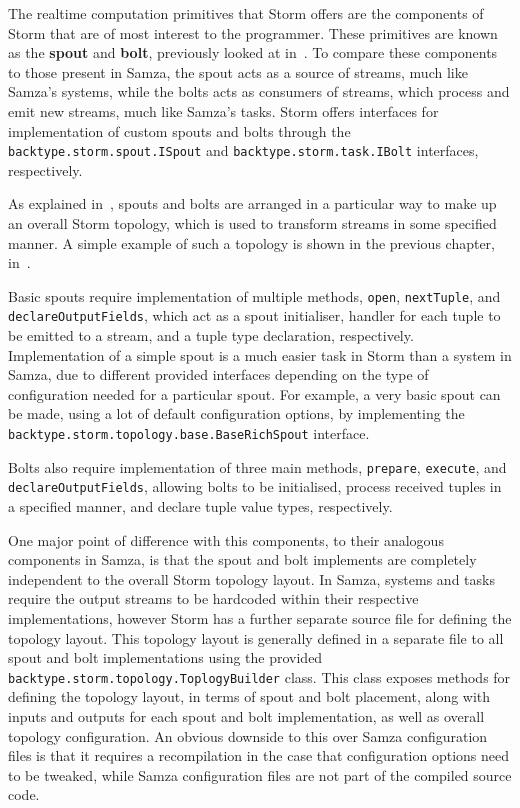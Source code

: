 The realtime computation primitives that Storm offers are the components of Storm that are of most interest to the programmer.
These primitives are known as the \textbf{spout} and \textbf{bolt}, previously looked at in~. To compare
these components to those present in Samza, the spout acts as a source of streams, much like Samza's systems, while the
bolts acts as consumers of streams, which process and emit new streams, much like Samza's tasks. Storm offers interfaces
for implementation of custom spouts and bolts through the \texttt{backtype.storm.spout.ISpout} and \texttt{backtype.storm.task.IBolt}
interfaces, respectively.

As explained in~, spouts and bolts are arranged in a particular way to make up an overall Storm topology,
which is used to transform streams in some specified manner. A simple example of such a topology is shown in the previous
chapter, in~.

Basic spouts require implementation of multiple methods, \texttt{open}, \texttt{nextTuple}, and \texttt{declareOutputFields},
which act as a spout initialiser, handler for each tuple to be emitted to a stream, and a tuple type declaration, respectively.
Implementation of a simple spout is a much easier task in Storm than a system in Samza, due to different provided interfaces
depending on the type of configuration needed for a particular spout. For example, a very basic spout can be made, using
a lot of default configuration options, by implementing the \texttt{backtype.storm.topology.base.BaseRichSpout} interface.

Bolts also require implementation of three main methods, \texttt{prepare}, \texttt{execute}, and \texttt{declareOutputFields},
allowing bolts to be initialised, process received tuples in a specified manner, and declare tuple value types, respectively.

One major point of difference with this components, to their analogous components in Samza, is that the spout and bolt
implements are completely independent to the overall Storm topology layout. In Samza, systems and tasks require the output
streams to be hardcoded within their respective implementations, however Storm has a further separate source file for
defining the topology layout. This topology layout is generally defined in a separate file to all spout and bolt implementations
using the provided \texttt{backtype.storm.topology.ToplogyBuilder} class. This class exposes methods for defining the
topology layout, in terms of spout and bolt placement, along with inputs and outputs for each spout and bolt implementation,
as well as overall topology configuration. An obvious downside to this over Samza configuration files is that it requires
a recompilation in the case that configuration options need to be tweaked, while Samza configuration files are not part
of the compiled source code.

